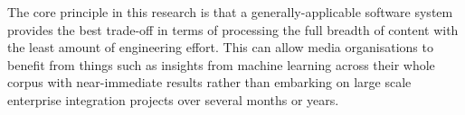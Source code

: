 The core principle in this research is that a generally-applicable
software system provides the best trade-off in terms of processing
the full breadth of content with the least amount of engineering
effort. This can allow media organisations to benefit from things
such as insights from machine learning across their whole corpus with
near-immediate results rather than embarking on large scale enterprise
integration projects over several months or years.
